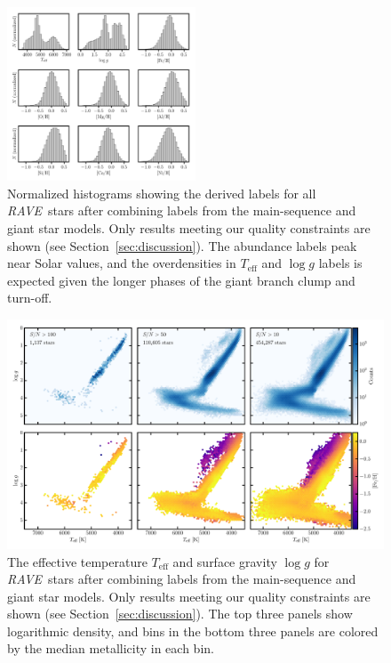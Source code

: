 \documentclass[preprint]{aastex}
\newcommand{\acronym}[1]{{\small{#1}}}
\newcommand{\project}[1]{\textsl{#1}}
\newcommand{\rave}{\project{\acronym{RAVE}}}
\newcommand{\teff}{T_{\mathrm{eff}}}
\newcommand{\logg}{\log g}
\begin{document}
\begin{figure}[p]
\center
\includegraphics[width=0.5\textwidth]{figures/label-histograms.pdf}
\caption{Normalized histograms showing the derived labels for all \rave\ stars after combining labels from the main-sequence and giant star models. Only results meeting our quality constraints are shown (see Section~\ref{sec:discussion}). The abundance labels peak near Solar values, and the overdensities in $\teff$ and $\logg$ labels is expected given the longer phases of the giant branch clump and turn-off.\label{fig:label-histograms}}
\end{figure}


\begin{figure}[p]
\includegraphics[width=\textwidth]{figures/hrd-test-set.pdf}
\caption{The effective temperature $\teff$ and surface gravity $\logg$ for \rave\ stars after combining labels from the main-sequence and giant star models.  Only results meeting our quality constraints are shown (see Section~\ref{sec:discussion}). The top three panels show logarithmic density, and bins in the bottom three panels are colored by the median metallicity in each bin.\label{fig:test-set-hrd}}
\end{figure}
\end{document}
